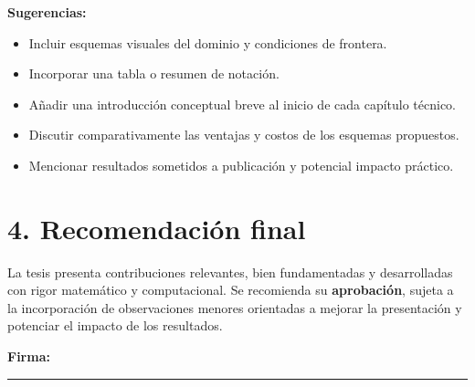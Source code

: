 \documentclass[12pt]{article}
\begin{document}
\textbf{Sugerencias:}
\begin{itemize}[leftmargin=0.5cm]
  \item Incluir esquemas visuales del dominio y condiciones de frontera.
  \item Incorporar una tabla o resumen de notación.
  \item Añadir una introducción conceptual breve al inicio de cada capítulo técnico.
  \item Discutir comparativamente las ventajas y costos de los esquemas propuestos.
  \item Mencionar resultados sometidos a publicación y potencial impacto práctico.
\end{itemize}

\section*{4. Recomendación final}
La tesis presenta contribuciones relevantes, bien fundamentadas y desarrolladas con rigor matemático y computacional. Se recomienda su \textbf{aprobación}, sujeta a la incorporación de observaciones menores orientadas a mejorar la presentación y potenciar el impacto de los resultados.

\vspace{0.5cm}
\noindent\textbf{Firma:} \\[1cm]
\rule{7cm}{0.4pt} \\ 
[Nombre del evaluador] \\ 
[Institución]
\end{document}
